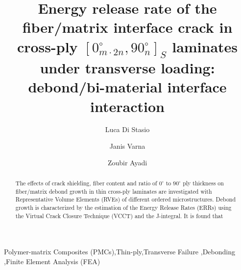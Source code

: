 \documentclass[review]{elsarticle}
\begin{document}
\begin{frontmatter}

\title{Energy release rate of the fiber/matrix interface crack in cross-ply $\left[0_{m\cdot2n}^{\circ},90_{n}^{\circ}\right]_{S}$ laminates under transverse loading: debond/bi-material interface interaction}


\author[nancy,lulea]{Luca Di Stasio}
\author[lulea]{Janis Varna}
\author[nancy]{Zoubir Ayadi}


\address[nancy]{Universit\'e de Lorraine, EEIGM, IJL, 6 Rue Bastien Lepage, F-54010 Nancy, France}
\address[lulea]{Lule\aa\ University of Technology, University Campus, SE-97187 Lule\aa, Sweden}

\begin{abstract}
\noindent
The effects of crack shielding, fiber content and ratio of $0^{\circ}$ to $90^{\circ}$ ply thickness on fiber/matrix debond growth in thin cross-ply laminates are investigated with Representative Volume Elements (RVEs) of different ordered microstructures. Debond growth is characterized by the estimation of the Energy Release Rates (ERRs) using the Virtual Crack Closure Technique (VCCT) and the J-integral. It is found that 
\end{abstract}

\begin{keyword}
Polymer-matrix Composites (PMCs)\sep Thin-ply\sep Transverse Failure \sep Debonding \sep Finite Element Analysis (FEA)
\end{keyword}


\end{frontmatter}
\end{document}
